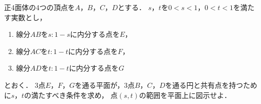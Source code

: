\documentclass[../../main.tex]{subfiles}
\begin{document}
正4面体の4つの頂点を$A$，$B$，$C$，$D$とする．
$s$，$t$を$0<s<1$，$0<t<1$を満たす実数とし，
\begin{enumerate}
  \item []線分$AB$を$s:1-s$に内分する点を$E$，
  \item []線分$AC$を$t:1-t$に内分する点を$F$，
  \item []線分$AD$を$t:1-t$に内分する点を$G$
\end{enumerate}
とおく．
3点$E$，$F$，$G$を通る平面が，3点$B$，$C$，$D$を通る円と共有点を持つために$s$，$t$の満たすべき条件を求め，
点$(s,t)$の範囲を平面上に図示せよ．
\end{document}
